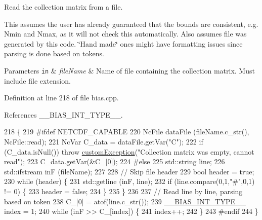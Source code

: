 Read the collection matrix from a file. 

This assumes the user has already guaranteed that the bounds are consistent, e.\+g. Nmin and Nmax, as it will not check this automatically. Also assumes file was generated by this code. \char`\"{}\+Hand made\char`\"{} ones might have formatting issues since parsing is done based on tokens.


\begin{DoxyParams}[1]{Parameters}
\mbox{\tt in}  & {\em file\+Name} & Name of file containing the collection matrix. Must include file extension. \\
\hline
\end{DoxyParams}


Definition at line 218 of file bias.\+cpp.



References \+\_\+\+\_\+\+B\+I\+A\+S\+\_\+\+I\+N\+T\+\_\+\+T\+Y\+P\+E\+\_\+\+\_\+.


\begin{DoxyCode}
218                                           \{
219 \textcolor{preprocessor}{#ifdef NETCDF\_CAPABLE}
220                 NcFile dataFile (fileName.c\_str(), NcFile::read);
221                 NcVar C\_data = dataFile.getVar(\textcolor{stringliteral}{"C"});
222                 \textcolor{keywordflow}{if} (C\_data.isNull()) \textcolor{keywordflow}{throw} \hyperlink{classcustom_exception}{customException}(\textcolor{stringliteral}{"Collection matrix was empty,
       cannot read"});
223                 C\_data.getVar(&C\_[0]);
224 \textcolor{preprocessor}{#else}
225                 std::string line;
226                 std::ifstream inF (fileName);
227                 
228                 \textcolor{comment}{// Skip file header}
229                 \textcolor{keywordtype}{bool} header = \textcolor{keyword}{true};
230                 \textcolor{keywordflow}{while} (header) \{
231                                 std::getline (inF, line);
232                                 \textcolor{keywordflow}{if} (line.compare(0,1,\textcolor{stringliteral}{"#"},0,1) != 0) \{
233                                                 header = \textcolor{keyword}{false};
234                                 \}
235                 \}
236                 
237                 \textcolor{comment}{// Read line by line, parsing based on token}
238                 C\_[0] = atof(line.c\_str());
239                 \hyperlink{bias_8h_a1ceb524363fcb94da0c64d297ea27438}{\_\_BIAS\_INT\_TYPE\_\_} index = 1;
240                 \textcolor{keywordflow}{while} (inF >> C\_[index]) \{
241                                 index++;
242                 \}
243 \textcolor{preprocessor}{#endif}
244 \}
\end{DoxyCode}
\hypertarget{classtmmc_a0c6c9f978b2093d1f4f6da7842093f3f}{}
